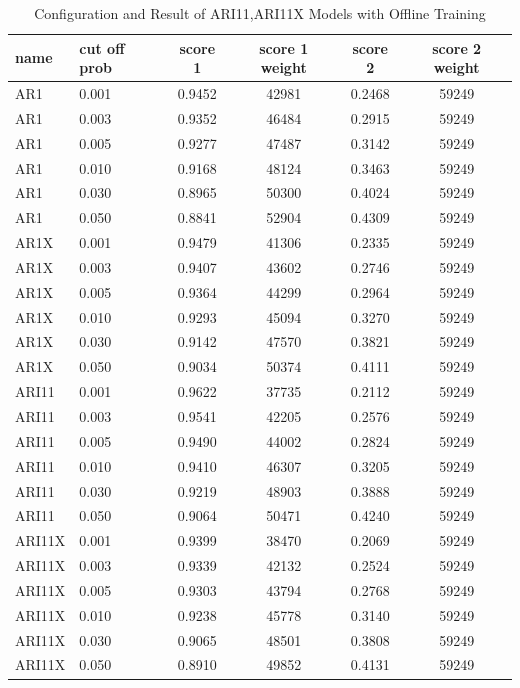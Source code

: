 \documentclass{article}
\begin{document}
\begin{longtable}[htbp]{l|l|*{4}{c}}
    \caption{Configuration and Result of ARI11,ARI11X Models with Offline Training}
    \label{tab:tab1.3.1} \\
    \textbf{name} & \textbf{cut off prob} & \textbf{score 1} & \textbf{score 1 weight} & \textbf{score 2} & \textbf{score 2 weight}\\
    \hline
    AR1 & 0.001 & 0.9452 & 42981 & 0.2468 & 59249\\
    AR1 & 0.003 & 0.9352 & 46484 & 0.2915 & 59249\\
    AR1 & 0.005 & 0.9277 & 47487 & 0.3142 & 59249\\
    AR1 & 0.010 & 0.9168 & 48124 & 0.3463 & 59249\\
    AR1 & 0.030 & 0.8965 & 50300 & 0.4024 & 59249\\
    AR1 & 0.050 & 0.8841 & 52904 & 0.4309 & 59249\\
    AR1X & 0.001 & 0.9479 & 41306 & 0.2335 & 59249\\
    AR1X & 0.003 & 0.9407 & 43602 & 0.2746 & 59249\\
    AR1X & 0.005 & 0.9364 & 44299 & 0.2964 & 59249\\
    AR1X & 0.010 & 0.9293 & 45094 & 0.3270 & 59249\\
    AR1X & 0.030 & 0.9142 & 47570 & 0.3821 & 59249\\
    AR1X & 0.050 & 0.9034 & 50374 & 0.4111 & 59249\\
    ARI11 & 0.001 & 0.9622 & 37735 & 0.2112 & 59249\\
    ARI11 & 0.003 & 0.9541 & 42205 & 0.2576 & 59249\\
    ARI11 & 0.005 & 0.9490 & 44002 & 0.2824 & 59249\\
    ARI11 & 0.010 & 0.9410 & 46307 & 0.3205 & 59249\\
    ARI11 & 0.030 & 0.9219 & 48903 & 0.3888 & 59249\\
    ARI11 & 0.050 & 0.9064 & 50471 & 0.4240 & 59249\\
    ARI11X & 0.001 & 0.9399 & 38470 & 0.2069 & 59249\\
    ARI11X & 0.003 & 0.9339 & 42132 & 0.2524 & 59249\\
    ARI11X & 0.005 & 0.9303 & 43794 & 0.2768 & 59249\\
    ARI11X & 0.010 & 0.9238 & 45778 & 0.3140 & 59249\\
    ARI11X & 0.030 & 0.9065 & 48501 & 0.3808 & 59249\\
    ARI11X & 0.050 & 0.8910 & 49852 & 0.4131 & 59249\\

\end{longtable}
\end{document}
